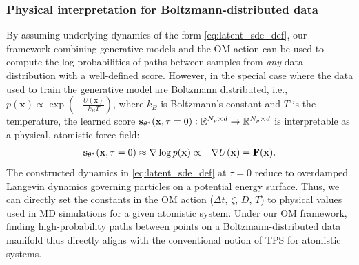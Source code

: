 \subsubsection{Physical interpretation for Boltzmann-distributed data}
\label{sec:phys_interp}
By assuming underlying dynamics of the form \eqref{eq:latent_sde_def}, our framework combining generative models and the OM action can be used to compute the log-probabilities of paths between samples from \textit{any} data distribution with a well-defined score. However, in the special case where the data used to train the generative model are Boltzmann distributed, i.e., $p(\mathbf{x}) \propto \exp{(-\frac{U(\mathbf{x})}{k_BT})}$, where $k_B$ is Boltzmann's constant and $T$ is the temperature, the learned score $\mathbf{s}_{\theta^*}(\mathbf{x}, \tau = 0): \mathbb{R}^{N_p \times d} \rightarrow \mathbb{R}^{N_p \times d}$ 
is interpretable as a physical, atomistic force field:
\begin{align}
    \mathbf{s}_{\theta^*}(\mathbf{x}, \tau =0) \approx \nabla \log p(\mathbf{x}) \propto - \nabla U(\mathbf{x}) = \mathbf{F}(\mathbf{x}).
\end{align}
The constructed dynamics in \eqref{eq:latent_sde_def} at $\tau=0$ reduce to overdamped Langevin dynamics governing particles on a potential energy surface. Thus, we can directly set the constants in the OM action ($\Delta t$, $\zeta$, $D$, $T$) to physical values used in MD simulations for a given atomistic system. Under our OM framework, finding high-probability paths between points on a Boltzmann-distributed data manifold thus directly aligns with the conventional notion of TPS for atomistic systems.
